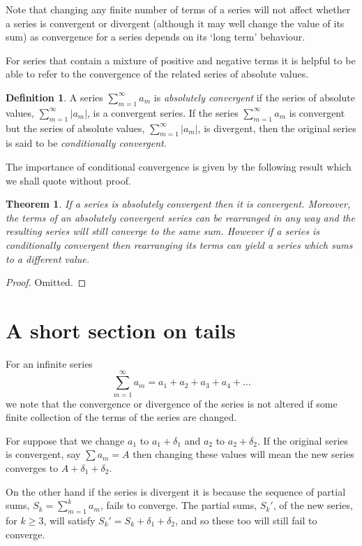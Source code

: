 \documentclass[extrafontsizes, twoside, a4paper]{memoir}
\theoremstyle{plain}%
\newtheorem{thm}{Theorem}[chapter]
\theoremstyle{definition}
\newtheorem{defn}{Definition}[chapter]
\theoremstyle{remark}
\begin{document}
Note that changing any finite number of terms of a series will not affect whether a series is convergent or divergent (although it may well change the value of its sum) as convergence for a series depends on its `long term' behaviour.

For series that contain a mixture of positive and negative terms it is helpful to be able to refer to the convergence of the related series of absolute values.
\begin{defn}
A series $\sum_{m=1}^\infty a_m$ is \emph{absolutely convergent} if the series of absolute values, $\sum _{m=1}^\infty \left | a_m \right |$, is a convergent series.
If the series  $\sum_{m=1}^\infty a_m$ is convergent but the series  of absolute values, $\sum _{m=1}^\infty \left | a_m \right |$, is divergent, then the original series is said to be \emph{conditionally convergent}.
\end{defn}

The importance of conditional convergence is given by the following result which we shall quote without proof.
\begin{thm}
If a series is absolutely convergent then it is convergent. Moreover, the terms of an absolutely convergent series can be rearranged in any way and the resulting series will still converge to the same sum. However if a series is conditionally convergent then rearranging its terms can yield a series which sums to a different value.
\end{thm}
\begin{proof}
Omitted.
\end{proof}

\section{A short section on tails}
For an infinite series
$$\sum_{m=1}^\infty a_m = a_1 + a_2 + a_3 + a_4 + \dots$$
we note that the convergence or divergence of the series is not altered if some finite collection of the terms of the series are changed.

For suppose that we change $a_1$ to $a_1 + \delta_1$ and $a_2$ to $a_2 + \delta_2$.
If the original series is convergent, say $\sum a_m = A$ then changing these values will mean the new series converges to $A+\delta_1+\delta_2$.

On the other hand if the series is divergent it is because the sequence of partial sums, $S_k = \sum_{m=1}^k a_m$, fails to converge. The partial sums, $S_k'$, of the new series, for $k \geq 3$, will satisfy $S_k' = S_k + \delta_1+\delta_2$, and so these too will still fail to converge.
\end{document}
